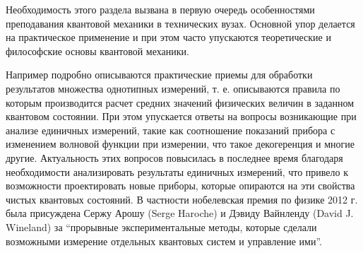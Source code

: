 Необходимость этого раздела вызвана в первую очередь особенностями
преподавания квантовой механики в технических вузах. Основной упор
делается на практическое применение и при этом часто упускаются
теоретические и философские основы квантовой механики.

Например подробно описываются практические приемы для обработки
результатов множества однотипных измерений, т. е. описываются правила
по которым производится расчет средних значений физических величин в
заданном квантовом состоянии. При этом упускается ответы на вопросы
возникающие при анализе единичных измерений, такие как соотношение
показаний прибора с изменением волновой функции при измерении, что
такое декогеренция 
и многие другие. Актуальность этих вопросов
повысилась в последнее время благодаря необходимости анализировать
результаты единичных измерений, что привело к возможности
проектировать новые приборы, которые опираются на эти свойства чистых
квантовых состояний. В частности нобелевская премия по физике 2012
г. была присуждена  Сержу Арошу (Serge Haroche) и
Дэвиду Вайнленду (David J. Wineland) за ``прорывные
экспериментальные методы, которые сделали возможными измерение
отдельных квантовых систем и управление ими''. 
